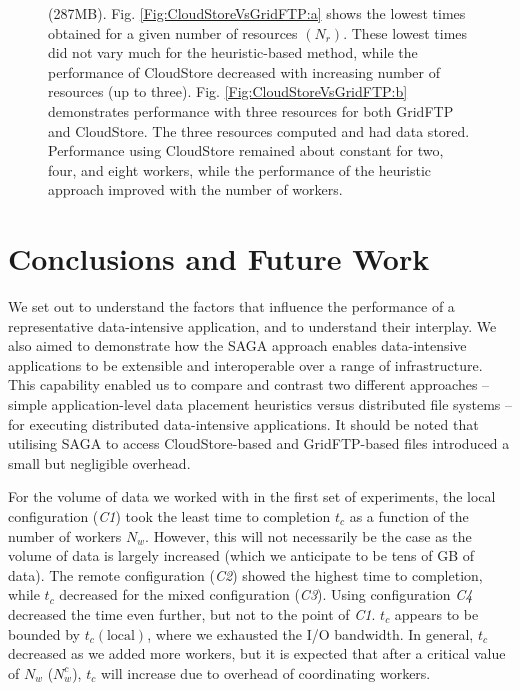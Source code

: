 \documentclass{rspublic}
\begin{document}
\begin{figure}
\begin{center}
{\label{Fig:CloudStoreVsGridFTP:b}
}
\caption{(287MB). Fig. \ref{Fig:CloudStoreVsGridFTP:a}
 shows the lowest times obtained for a given number of resources
 $(N_{r})$. These lowest times did not vary much for the heuristic-based 
 method, while the performance of CloudStore decreased with increasing number of
 resources (up to three). Fig. \ref{Fig:CloudStoreVsGridFTP:b}
 demonstrates performance with three resources for both GridFTP and
 CloudStore. The three resources computed and had data stored.
 Performance using CloudStore remained about constant for two, four, and
 eight workers, while the performance of the heuristic approach improved
 with the number of workers.}
\label{Fig:CloudStoreVsGridFTP}
\end{center}
\vspace{-0.4cm}
\end{figure}

%
\vspace{-0.5cm}

\section{Conclusions and Future Work}


We set out to understand the factors that influence the performance of
a representative data-intensive application, and to understand their
interplay. We also aimed to demonstrate how the SAGA approach enables
data-intensive applications to be extensible and interoperable over a
range of infrastructure. This capability enabled us to compare and
contrast two different approaches -- simple application-level data
placement heuristics versus distributed file systems -- for executing
distributed data-intensive applications. It should be noted that 
utilising SAGA to access CloudStore-based and GridFTP-based files
introduced a small but negligible overhead.

For the volume of data we worked with in the first set of experiments,
the local configuration (\textit{C1}) took the least time to completion $t_c$
as a function of the number of workers $N_w$. However, this will not
necessarily be the case as the volume of data is largely increased
(which we anticipate to be tens of GB of data). The remote
configuration (\textit{C2}) showed the highest time to completion, while
$t_c$ decreased for the mixed configuration (\textit{C3}). Using
configuration \textit{C4} decreased the time even further, but not to the
point of \textit{C1}. $t_c$ appears to be bounded by $t_c(\mbox{local})$,
where we exhausted the I/O bandwidth. In general, $t_c$ decreased as
we added more workers, but it is expected that after a critical value
of $N_w$ ($N^c_w$), $t_c$ will increase due to overhead of
coordinating workers.
\end{document}

